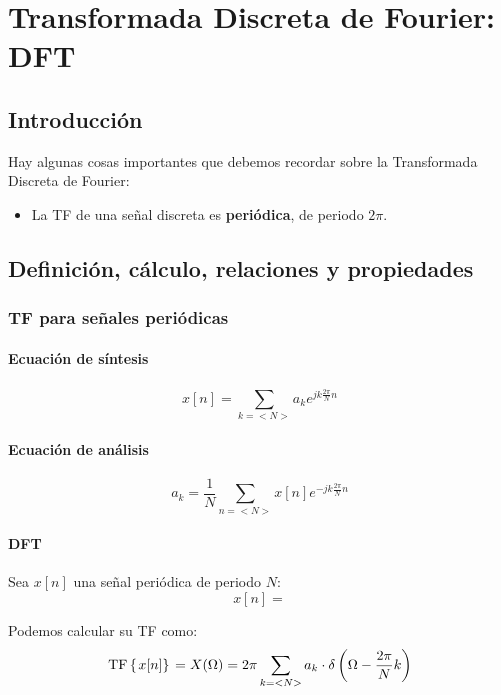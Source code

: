 \documentclass[a4paper,oneside]{book}
\begin{document}
\chapter{Transformada Discreta de Fourier: DFT}

\section{Introducción}

Hay algunas cosas importantes que debemos recordar sobre la Transformada Discreta de Fourier:

\begin{itemize}
	\item La TF de una señal discreta es \textbf{periódica}, de periodo $2\pi$.
\end{itemize}

\section{Definición, cálculo, relaciones y propiedades}

\subsection{TF para señales periódicas}

\begin{multicols}{2}
	\subsubsection{Ecuación de síntesis}
	
	\[ x[n] = \sum_{k=<N>}^{}a_ke^{jk \frac{2\pi}{N} n}\]
	
	\subsubsection{Ecuación de análisis}
	
	\[ a_k = \frac{1}{N}\sum_{n=<N>}x[n]e^{-jk \frac{2\pi}{N}n} \]
	
\end{multicols}

\subsubsection{DFT}

Sea $x[n]$ una señal periódica de periodo $N$: \[ x[n] = \]

Podemos calcular su TF como:
\[ \mathrm{TF} \left\lbrace \left. x[n] \right\rbrace \right. = X(\Omega ) = 2\pi \sum_{k=<N>}a_k \cdot \delta \left( \Omega - \frac{2\pi}{N}k \right)\]
\end{document}
